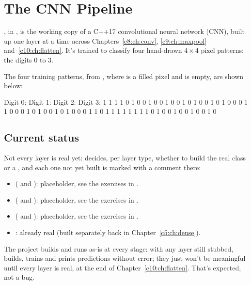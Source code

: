 
\section{The CNN Pipeline}
\label{c8:sec:pipeline}
, in , is the working copy of a C++17 convolutional
neural network (CNN), built up one layer at a time across Chapters~\ref{c8:ch:conv},
\ref{c9:ch:maxpool} and~\ref{c10:ch:flatten}. It's trained to classify four hand-drawn 4\,×\,4
pixel patterns: the digits 0 to 3.

The four training patterns, from , where  is a filled pixel and
 is empty, are shown below:

\begin{console}
Digit 0:      Digit 1:      Digit 2:      Digit 3:
1 1 1 1       0 1 0 0       1 0 0 1       0 0 1 0
1 0 0 1       0 1 0 0       0 1 1 0       0 0 1 0
1 0 0 1       0 1 0 0       0 1 1 0       1 1 1 1
1 1 1 1       0 1 0 0       1 0 0 1       0 0 1 0
\end{console}

\subsection{Current status}
Not every layer is real yet:  decides, per layer type, whether
to build the real class or a , and each one not yet built is marked with a
 comment there:
\begin{itemize}
  \item \textbf{} ( and ): placeholder, see
    the exercises in .
  \item \textbf{} ( and ):
    placeholder, see the exercises in .
  \item \textbf{} ( and ):
    placeholder, see the exercises in .
  \item \textbf{}: already real (built separately back in Chapter~\ref{c5:ch:dense}).
\end{itemize}
The project builds and runs as-is at every stage: with any layer still stubbed,  builds,
trains and prints predictions without error; they just won't be meaningful until every layer is
real, at the end of Chapter~\ref{c10:ch:flatten}. That's expected, not a bug.

